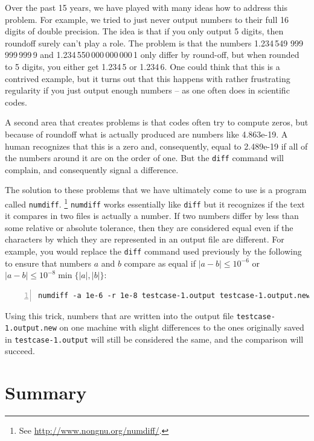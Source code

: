 \documentclass{article}
\begin{document}
Over the past 15 years, we have played with many ideas how to address this
problem. For example, we tried to just never output numbers to their full 16
digits of double precision. The idea is that if you only output 5 digits, then
roundoff surely can't play a role. The problem is that the numbers 1.234\,549
999\,999\,999\,9 and 1.234\,550\,000\,000\,000\,1 only differ by round-off,
but when rounded to 5 digits, you either get 1.234\,5 or 1.234\,6. One could
think that this is a contrived example, but it turns out that this happens
with rather frustrating regularity if you just output enough numbers -- as one
often does in scientific codes.

A second area that creates problems is that codes often try to compute zeros, but
because of roundoff what is actually produced are numbers like
4.863e-19. A human recognizes that this is a zero and, consequently, equal to
2.489e-19 if all of the numbers around it are on the order of one. But the
\texttt{diff} command will complain, and consequently signal a difference.

The solution to these problems that we have ultimately come to use
is a program called \texttt{numdiff}.%
\footnote{See \url{http://www.nongnu.org/numdiff/}.}
\texttt{numdiff} works essentially like
\texttt{diff} but it recognizes if the text it compares in two files is
actually a number. If two numbers differ by less than some relative or
absolute tolerance, then they are considered equal even if the characters by
which they are represented in an output file are different. For example, you
would replace the \texttt{diff} command used previously by the
following to ensure that numbers $a$ and $b$ compare as equal if $|a-b|\le
10^{-6}$ or $|a-b|\le 10^{-8} \min\{|a|,|b|\}$:
\begin{lstlisting}[frame=single,basicstyle=\footnotesize,numbers=left,language=csh]
  numdiff -a 1e-6 -r 1e-8 testcase-1.output testcase-1.output.new
\end{lstlisting}
Using this trick, numbers that are written into the output file
\texttt{testcase-1.output.new} on one machine with slight differences to the
ones originally saved in \texttt{testcase-1.output} will still be considered
the same, and the comparison will succeed.



\section{Summary}
\label{sec:conclusions}
\end{document}
